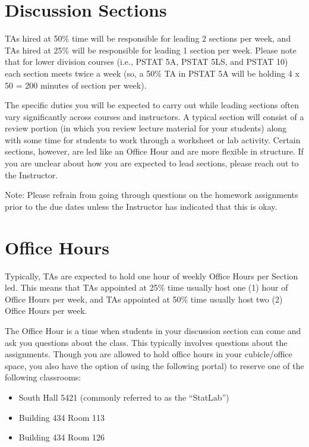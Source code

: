 \documentclass[
  letterpaper,
  DIV=11,
  numbers=noendperiod]{scrreprt}
\providecommand{\tightlist}{%
  \setlength{\itemsep}{0pt}\setlength{\parskip}{0pt}}\usepackage{longtable,booktabs,array}
\begin{document}
\hypertarget{discussion-sections}{%
\chapter{Discussion Sections}\label{discussion-sections}}

TAs hired at 50\% time will be responsible for leading 2 sections per
week, and TAs hired at 25\% will be responsible for leading 1 section
per week. Please note that for lower division courses (i.e., PSTAT 5A,
PSTAT 5LS, and PSTAT 10) each section meets twice a week (so, a 50\% TA
in PSTAT 5A will be holding 4 x 50 = 200 minutes of section per week).

The specific duties you will be expected to carry out while leading
sections often vary significantly across courses and instructors. A
typical section will consist of a review portion (in which you review
lecture material for your students) along with some time for students to
work through a worksheet or lab activity. Certain sections, however, are
led like an Office Hour and are more flexible in structure. If you are
unclear about how you are expected to lead sections, please reach out to
the Instructor.

Note: Please refrain from going through questions on the homework
assignments prior to the due dates unless the Instructor has indicated
that this is okay.

\hypertarget{office-hours}{%
\chapter{Office Hours}\label{office-hours}}

Typically, TAs are expected to hold one hour of weekly Office Hours per
Section led. This means that TAs appointed at 25\% time usually host one
(1) hour of Office Hours per week, and TAs appointed at 50\% time
usually host two (2) Office Hours per week.

The Office Hour is a time when students in your discussion section can
come and ask you questions about the class. This typically involves
questions about the assignments. Though you are allowed to hold office
hours in your cubicle/office space, you also have the option of using
the following portal) to reserve one of the following classrooms:

\begin{itemize}
\tightlist
\item
  South Hall 5421 (commonly referred to as the ``StatLab'')
\item
  Building 434 Room 113
\item
  Building 434 Room 126
\end{itemize}
\end{document}
